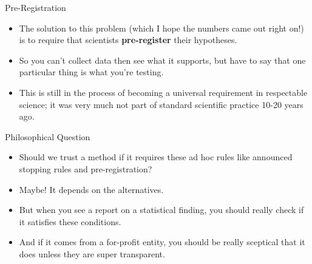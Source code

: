 \documentclass[
  ignorenonframetext,
]{beamer}
\providecommand{\tightlist}{%
  \setlength{\itemsep}{0pt}\setlength{\parskip}{0pt}}
\renewcommand{\,}{\text{, }}
\begin{document}
\begin{frame}{Pre-Registration}
\protect\hypertarget{pre-registration}{}

\begin{itemize}
\tightlist
\item
  The solution to this problem (which I hope the numbers came out right
  on!) is to require that scientists \textbf{pre-register} their
  hypotheses.
\item
  So you can't collect data then see what it supports, but have to say
  that one particular thing is what you're testing.
\item
  This is still in the process of becoming a universal requirement in
  respectable science; it was very much not part of standard scientific
  practice 10-20 years ago.
\end{itemize}

\end{frame}

\begin{frame}{Philosophical Question}
\protect\hypertarget{philosophical-question}{}

\begin{itemize}
\tightlist
\item
  Should we trust a method if it requires these ad hoc rules like
  announced stopping rules and pre-registration? \pause
\item
  Maybe! It depends on the alternatives.
\item
  But when you see a report on a statistical finding, you should really
  check if it satisfies these conditions.
\item
  And if it comes from a for-profit entity, you should be really
  sceptical that it does unless they are super transparent.
\end{itemize}

\end{frame}
\end{document}
